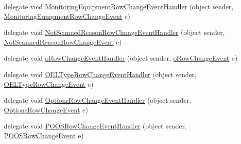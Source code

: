 \begin{DoxyCompactItemize}
delegate void \hyperlink{class_env_int_1_1_win32_1_1_field_tech_1_1_manager_1_1_data_sets_1_1_guide_ware_mobile_data_set_a394b1514a56224f6d11f74408383305b}{Monitoring\+Equipment\+Row\+Change\+Event\+Handler} (object sender, \hyperlink{class_env_int_1_1_win32_1_1_field_tech_1_1_manager_1_1_data_sets_1_1_guide_ware_mobile_data_set_508b9e1e7fb778ecd4f9ec08c0203079}{Monitoring\+Equipment\+Row\+Change\+Event} e)
\item 
delegate void \hyperlink{class_env_int_1_1_win32_1_1_field_tech_1_1_manager_1_1_data_sets_1_1_guide_ware_mobile_data_set_a648fc43ba2f86d7260eb36d5f83eef39}{Not\+Scanned\+Reason\+Row\+Change\+Event\+Handler} (object sender, \hyperlink{class_env_int_1_1_win32_1_1_field_tech_1_1_manager_1_1_data_sets_1_1_guide_ware_mobile_data_set_26a68af3739fcf7dfebacfa26943a678}{Not\+Scanned\+Reason\+Row\+Change\+Event} e)
\item 
delegate void \hyperlink{class_env_int_1_1_win32_1_1_field_tech_1_1_manager_1_1_data_sets_1_1_guide_ware_mobile_data_set_aa04c239e0bbbba02cb09adcdafb9d5eb}{o\+Row\+Change\+Event\+Handler} (object sender, \hyperlink{class_env_int_1_1_win32_1_1_field_tech_1_1_manager_1_1_data_sets_1_1_guide_ware_mobile_data_set_1_1o_row_change_event}{o\+Row\+Change\+Event} e)
\item 
delegate void \hyperlink{class_env_int_1_1_win32_1_1_field_tech_1_1_manager_1_1_data_sets_1_1_guide_ware_mobile_data_set_a7b6f6097dcc632687fa93021de48da64}{O\+E\+L\+Type\+Row\+Change\+Event\+Handler} (object sender, \hyperlink{class_env_int_1_1_win32_1_1_field_tech_1_1_manager_1_1_data_sets_1_1_guide_ware_mobile_data_set_1_1_o_e_l_type_row_change_event}{O\+E\+L\+Type\+Row\+Change\+Event} e)
\item 
delegate void \hyperlink{class_env_int_1_1_win32_1_1_field_tech_1_1_manager_1_1_data_sets_1_1_guide_ware_mobile_data_set_a1f280d1d79852f0a6b8d9fe599e484d8}{Options\+Row\+Change\+Event\+Handler} (object sender, \hyperlink{class_env_int_1_1_win32_1_1_field_tech_1_1_manager_1_1_data_sets_1_1_guide_ware_mobile_data_set_1_1_options_row_change_event}{Options\+Row\+Change\+Event} e)
\item 
delegate void \hyperlink{class_env_int_1_1_win32_1_1_field_tech_1_1_manager_1_1_data_sets_1_1_guide_ware_mobile_data_set_a7bd082e708384fdec8592f2c19ce7174}{P\+O\+O\+S\+Row\+Change\+Event\+Handler} (object sender, \hyperlink{class_env_int_1_1_win32_1_1_field_tech_1_1_manager_1_1_data_sets_1_1_guide_ware_mobile_data_set_1_1_p_o_o_s_row_change_event}{P\+O\+O\+S\+Row\+Change\+Event} e)
\item 

\end{DoxyCompactItemize}
